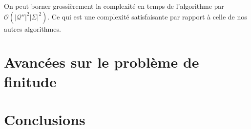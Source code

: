\documentclass[11pt,a4paper]{article}
\begin{document}
On peut borner grossièrement la complexité en temps de l'algorithme par $\mathcal{O}(|\mathcal{Q''}|^2|\Sigma|^2)$. Ce qui est une complexité satisfaisante par rapport à celle de nos autres algorithmes.

\section{Avancées sur le problème de finitude}

\section{Conclusions}

\newpage
{
  \nocite{*}
}

\end{document}

